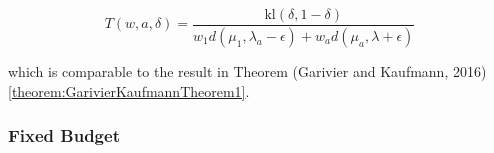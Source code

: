 \documentclass[12pt,]{article}
\begin{document}
\begin{equation}
T(w, a, \delta) = \frac{\text{kl}(\delta, 1-\delta)}{w_1 d(\mu_1, \lambda_a - \epsilon) + w_a d(\mu_a, \lambda + \epsilon)}
\end{equation}

which is comparable to the result in Theorem (Garivier and Kaufmann,
2016) \ref{theorem:GarivierKaufmannTheorem1}.

\subsubsection{Fixed Budget}\label{fixed-budget}
\end{document}
